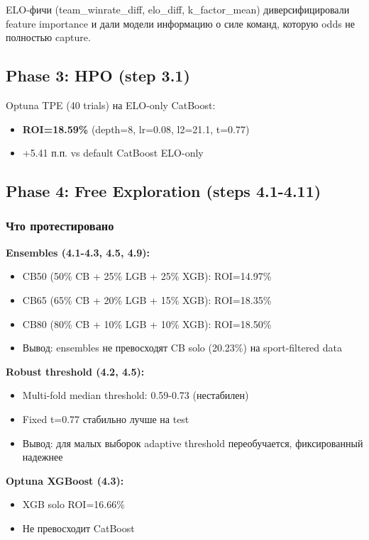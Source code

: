 \documentclass[12pt,a4paper]{article}
\begin{document}
ELO-фичи (team\_winrate\_diff, elo\_diff, k\_factor\_mean) диверсифицировали feature importance и дали модели информацию о силе команд, которую odds не полностью capture.

\subsection{Phase 3: HPO (step 3.1)}

Optuna TPE (40 trials) на ELO-only CatBoost:
\begin{itemize}
  \item \textbf{ROI=18.59\%} (depth=8, lr=0.08, l2=21.1, t=0.77)
  \item +5.41 п.п. vs default CatBoost ELO-only
\end{itemize}

\subsection{Phase 4: Free Exploration (steps 4.1-4.11)}

\subsubsection{Что протестировано}

\textbf{Ensembles (4.1-4.3, 4.5, 4.9):}
\begin{itemize}
  \item CB50 (50\% CB + 25\% LGB + 25\% XGB): ROI=14.97\%
  \item CB65 (65\% CB + 20\% LGB + 15\% XGB): ROI=18.35\%
  \item CB80 (80\% CB + 10\% LGB + 10\% XGB): ROI=18.50\%
  \item Вывод: ensembles не превосходят CB solo (20.23\%) на sport-filtered data
\end{itemize}

\textbf{Robust threshold (4.2, 4.5):}
\begin{itemize}
  \item Multi-fold median threshold: 0.59-0.73 (нестабилен)
  \item Fixed t=0.77 стабильно лучше на test
  \item Вывод: для малых выборок adaptive threshold переобучается, фиксированный надежнее
\end{itemize}

\textbf{Optuna XGBoost (4.3):}
\begin{itemize}
  \item XGB solo ROI=16.66\%
  \item Не превосходит CatBoost
\end{itemize}
\end{document}
